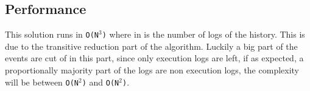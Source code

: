 \subsection{Performance} %
This solution runs in \texttt{O(N$^3$)} where in is the number of logs of the history. This is due to the transitive reduction part of the algorithm. Luckily a big part of the events are cut of in this part, since only execution logs are left, if as expected, a proportionally majority part of the logs are non execution logs, the complexity will be between \texttt{O(N$^2$)} and \texttt{O(N$^2$)}.

